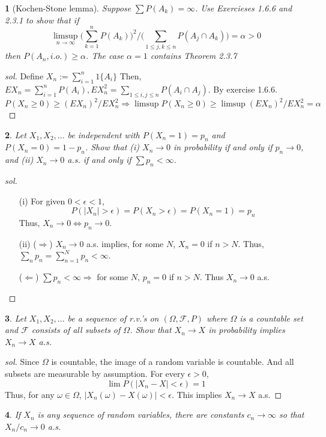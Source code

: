 \documentclass{report}
\newtheorem{ex}{}[section]
\begin{document}
\begin{ex}[Kochen-Stone lemma]
Suppose $\sum P(A_k) = \infty$. Use Exercieses 1.6.6 and 2.3.1 to show that if 
\[\limsup_{n\to\infty} \bigg(\sum_{k=1}^n P(A_k)\bigg)^2 \bigg/ \bigg(\sum_{1\le j,k\le n}P(A_j \cap A_k)\bigg) = \alpha > 0\]
then $P(A_n, i.o.) \ge \alpha$. The case $\alpha = 1$ contains Theorem 2.3.7
\end{ex}
\begin{proof}[sol]
Define $X_n := \sum_{i=1}^n 1\{A_i\}$ Then, $EX_n = \sum_{i=1}^n P(A_i), EX_n^2 = \sum_{1\le i,j \le n}P(A_i \cap A_j)$. By exercise 1.6.6.
\[P(X_n \ge 0) \ge (EX_n)^2/EX_n^2 \Rightarrow \limsup P(X_n \ge 0) \ge \limsup  (EX_n)^2/EX_n^2 = \alpha\]

\end{proof}
\begin{ex}
Let $X_1,X_2,...$ be independent with $P(X_n = 1) = p_n$ and $P(X_n = 0) = 1 - p_n$. Show that (i) $X_n \to 0$ in probability if and only if $p_n \to 0$, and (ii) $X_n \to 0$ a.s. if and only if $\sum p_n < \infty$.
\end{ex}
\begin{proof}[sol]~
\begin{enumerate}
\item[(i)]
For given $0 <\epsilon < 1$,
\[P(|X_n| > \epsilon) = P(X_n > \epsilon) = P(X_n = 1) = p_n\]
Thus, $X_n \to 0 \Leftrightarrow p_n \to 0$.
\item[(ii)]
($\Rightarrow$)
$X_n \to 0$ a.s. implies, for some $N$, $X_n = 0$ if $n > N$. Thus, $\sum_n p_n = \sum_{n=1}^N p_n <\infty$.

($\Leftarrow$)
$\sum p_n < \infty \Rightarrow$ for some $N$, $p_n = 0$ if $n > N$. Thus $X_n \to 0$ a.s.
\end{enumerate}
\end{proof}
\begin{ex}
Let $X_1,X_2,...$ be a sequence of r.v.'s on $(\Omega, \mathcal{F}, P)$ where $\Omega$ is a countable set and $\mathcal F$ consists of all subsets of $\Omega$. Show that $X_n \to X$ in probability implies $X_n \to X$ a.s.
\end{ex}
\begin{proof}[sol]
Since $\Omega$ is countable, the image of a random variable is countable. And all subsets are measurable by assumption. For every $\epsilon >0 $, 
\[\lim P(|X_n - X| < \epsilon ) = 1\]
Thus, for any $\omega \in \Omega$, $|X_n(\omega) - X(\omega)| < \epsilon$. This implies $X_n \to X$ a.s.
\end{proof}
\begin{ex}
If $X_n$ is any sequence of random variables, there are constants $c_n \to \infty$ so that $X_n / c_n \to 0$ a.s.
\end{ex}
\end{document}
